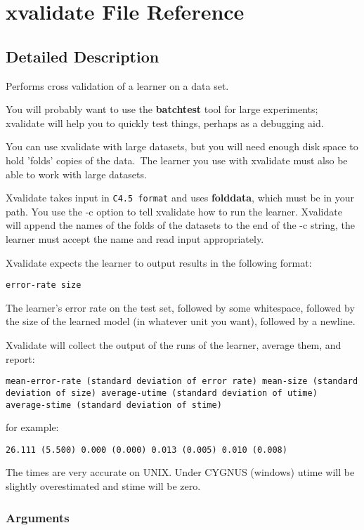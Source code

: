 \section{xvalidate File Reference}
\label{xvalidate}


\subsection{Detailed Description}
Performs cross validation of a learner on a data set. 

You will probably want to use the {\bf batchtest} tool for large experiments; xvalidate will help you to quickly test things, perhaps as a debugging aid.

You can use xvalidate with large datasets, but you will need enough disk space to hold 'folds' copies of the data.\  The learner you use with xvalidate must also be able to work with large datasets.

Xvalidate takes input in {\tt C4.5 format} and uses {\bf folddata}, which must be in your path. You use the -c option to tell xvalidate how to run the learner. Xvalidate will append the names of the folds of the datasets to the end of the -c string, the learner must accept the name and read input appropriately.

Xvalidate expects the learner to output results in the following format: 

{\tt error-rate size} 

The learner's error rate on the test set, followed by some whitespace, followed by the size of the learned model (in whatever unit you want), followed by a newline. 

Xvalidate will collect the output of the runs of the learner, average them, and report:

{\tt mean-error-rate (standard deviation of error rate) mean-size (standard deviation of size) average-utime (standard deviation of utime) average-stime (standard deviation of stime)}

for example:

{\tt 26.111 (5.500) 0.000 (0.000) 0.013 (0.005) 0.010 (0.008)}

The times are very accurate on UNIX. Under CYGNUS (windows) utime will be slightly overestimated and stime will be zero.

\subsubsection*{Arguments}

